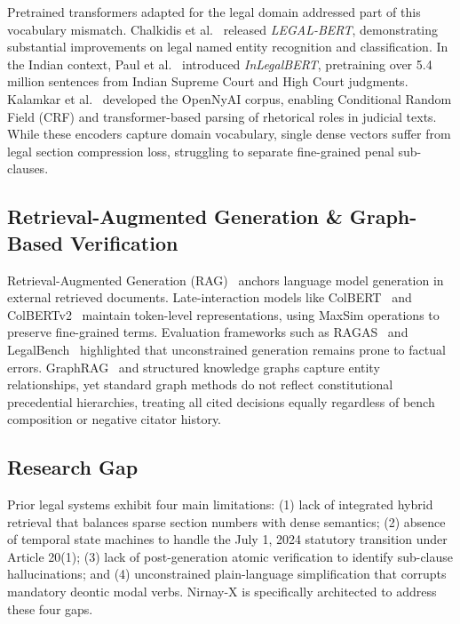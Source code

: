 \documentclass[conference]{IEEEtran}
\begin{document}
Pretrained transformers adapted for the legal domain addressed part of this vocabulary mismatch. Chalkidis et al.~\cite{chalkidis2020legal} released \textit{LEGAL-BERT}, demonstrating substantial improvements on legal named entity recognition and classification. In the Indian context, Paul et al.~\cite{paul2022pre} introduced \textit{InLegalBERT}, pretraining over 5.4 million sentences from Indian Supreme Court and High Court judgments. Kalamkar et al.~\cite{kalamkar2022corpus} developed the OpenNyAI corpus, enabling Conditional Random Field (CRF) and transformer-based parsing of rhetorical roles in judicial texts. While these encoders capture domain vocabulary, single dense vectors suffer from legal section compression loss, struggling to separate fine-grained penal sub-clauses.

\subsection{Retrieval-Augmented Generation \& Graph-Based Verification}
Retrieval-Augmented Generation (RAG)~\cite{lewis2020retrieval} anchors language model generation in external retrieved documents. Late-interaction models like ColBERT~\cite{khattab2020colbert} and ColBERTv2~\cite{santhanam2022colbertv2} maintain token-level representations, using MaxSim operations to preserve fine-grained terms. Evaluation frameworks such as RAGAS~\cite{es2024ragas} and LegalBench~\cite{guha2023legalbench} highlighted that unconstrained generation remains prone to factual errors. GraphRAG~\cite{edge2024graphrag} and structured knowledge graphs capture entity relationships, yet standard graph methods do not reflect constitutional precedential hierarchies, treating all cited decisions equally regardless of bench composition or negative citator history.

\subsection{Research Gap}
Prior legal systems exhibit four main limitations:
(1) lack of integrated hybrid retrieval that balances sparse section numbers with dense semantics;
(2) absence of temporal state machines to handle the July 1, 2024 statutory transition under Article 20(1);
(3) lack of post-generation atomic verification to identify sub-clause hallucinations; and
(4) unconstrained plain-language simplification that corrupts mandatory deontic modal verbs. Nirnay-X is specifically architected to address these four gaps.
\end{document}

